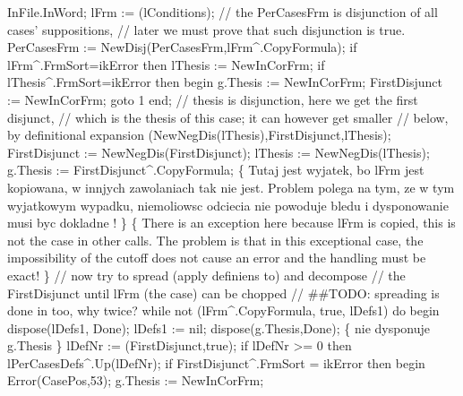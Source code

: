                InFile.InWord;
               lFrm := (lConditions);
               // the PerCasesFrm is disjunction of all cases' suppositions,
               // later we must prove that such disjunction is true.
               PerCasesFrm := NewDisj(PerCasesFrm,lFrm^.CopyFormula);
               if lFrm^.FrmSort=ikError then lThesis := NewInCorFrm;
               if lThesis^.FrmSort=ikError then
               begin g.Thesis := NewInCorFrm; FirstDisjunct := NewInCorFrm; goto 1 end;
               // thesis is disjunction, here we get the first disjunct,
               // which is the thesis of this case; it can however get smaller
               // below, by definitional expansion
               (NewNegDis(lThesis),FirstDisjunct,lThesis);
               FirstDisjunct := NewNegDis(FirstDisjunct);
               lThesis := NewNegDis(lThesis);
               g.Thesis := FirstDisjunct^.CopyFormula;
               \{ Tutaj jest wyjatek, bo lFrm jest kopiowana, w innjych zawolaniach
                  tak nie jest.
                 Problem polega na tym, ze w tym wyjatkowym wypadku,
                 niemoliowsc odciecia nie powoduje bledu i dysponowanie musi byc
                 dokladne !
               \}
               \{ There is an exception here because lFrm is copied,
                 this is not the case in other  calls.
                 The problem is that in this exceptional case,
                 the impossibility of the cutoff does not cause an error
                 and the handling must be exact!
                \}
               // now try to spread (apply definiens to) and decompose
               // the FirstDisjunct until lFrm (the case) can be chopped
               // ##TODO: spreading is done in  too, why twice?
               while not (lFrm^.CopyFormula, true, lDefs1) do
               begin
                  dispose(lDefs1, Done); lDefs1 := nil;
                  dispose(g.Thesis,Done);
                  \{  nie dysponuje g.Thesis \}
                  lDefNr := (FirstDisjunct,true);
                  if lDefNr >= 0 then lPerCasesDefs^.Up(lDefNr);
                  if FirstDisjunct^.FrmSort = ikError then
                  begin
                     Error(CasePos,53);
                     g.Thesis := NewInCorFrm;
